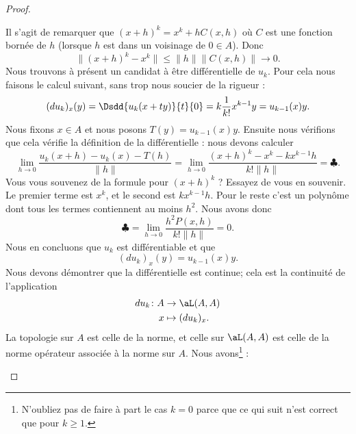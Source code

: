 \begin{proof}
\begin{subproof}
		Il s'agit de remarquer que \( (x+h)^k=x^k+hC(x,h)\) où \( C\) est une fonction bornée de \( h\) (lorsque \( h\) est dans un voisinage de \( 0\in A\)). Donc
		\begin{equation}
			\| (x+h)^k-x^k \|\leq \| h \|\| C(x,h) \|\to 0.
		\end{equation}
		Nous trouvons à présent un candidat à être différentielle de \( u_k\). Pour cela nous faisons le calcul suivant, sans trop nous soucier de la rigueur :
		\begin{equation}
			(du_k)_x(y)=\Dsdd{ u_k(x+ty) }{t}{0}=k\frac{1}{ k! }x^{k-1}y=u_{k-1}(x)y.
		\end{equation}
		Nous fixons \( x\in A\) et nous posons \( T(y)=u_{k-1}(x)y\). Ensuite nous vérifions que cela vérifie la définition de la différentielle : nous devons calculer
		\begin{equation}        \label{EQooNPKGooVmEYAV}
			\lim_{h\to 0} \frac{ u_k(x+h)-u_k(x)-T(h) }{ \| h \| }=\lim_{h\to 0} \frac{ (x+h)^k-x^k-kx^{k-1}h }{ k! \| h \| }=\clubsuit.
		\end{equation}
		Vous vous souvenez de la formule pour \( (x+h)^k\) ? Essayez de vous en souvenir. Le premier terme est \( x^k\), et le second est \( kx^{k-1}h\). Pour le reste c'est un polynôme dont tous les termes contiennent au moins \( h^2\). Nous avons donc
		\begin{equation}
			\clubsuit=\lim_{h\to 0} \frac{ h^2P(x,h) }{ k!\| h \| }=0.
		\end{equation}
		Nous en concluons que \( u_k\) est différentiable et que
		\begin{equation}
			(du_k)_x(y)=u_{k-1}(x)y.
		\end{equation}
		Nous devons démontrer que la différentielle est continue; cela est la continuité de l'application
		\begin{equation}
			\begin{aligned}
				du_k\colon A & \to \aL(A,A)      \\
				x            & \mapsto (du_k)_x.
			\end{aligned}
		\end{equation}
		La topologie sur \( A\) est celle de la norme, et celle sur \( \aL(A,A)\) est celle de la norme opérateur associée à la norme sur \( A\). Nous avons\footnote{N'oubliez pas de faire à part le cas \( k=0\) parce que ce qui suit n'est correct que pour \( k\geq 1\).} :

\end{subproof}
\end{proof}
